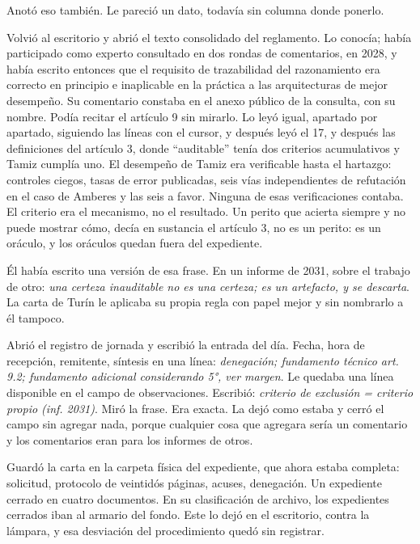 Anotó eso también. Le pareció un dato, todavía sin columna donde ponerlo.

Volvió al escritorio y abrió el texto consolidado del reglamento. Lo conocía; había participado como experto consultado en dos rondas de comentarios, en 2028, y había escrito entonces que el requisito de trazabilidad del razonamiento era correcto en principio e inaplicable en la práctica a las arquitecturas de mejor desempeño. Su comentario constaba en el anexo público de la consulta, con su nombre. Podía recitar el artículo 9 sin mirarlo. Lo leyó igual, apartado por apartado, siguiendo las líneas con el cursor, y después leyó el 17, y después las definiciones del artículo 3, donde ``auditable'' tenía dos criterios acumulativos y Tamiz cumplía uno. El desempeño de Tamiz era verificable hasta el hartazgo: controles ciegos, tasas de error publicadas, seis vías independientes de refutación en el caso de Amberes y las seis a favor. Ninguna de esas verificaciones contaba. El criterio era el mecanismo, no el resultado. Un perito que acierta siempre y no puede mostrar cómo, decía en sustancia el artículo 3, no es un perito: es un oráculo, y los oráculos quedan fuera del expediente.

Él había escrito una versión de esa frase. En un informe de 2031, sobre el trabajo de otro: \textit{una certeza inauditable no es una certeza; es un artefacto, y se descarta}. La carta de Turín le aplicaba su propia regla con papel mejor y sin nombrarlo a él tampoco.

Abrió el registro de jornada y escribió la entrada del día. Fecha, hora de recepción, remitente, síntesis en una línea: \textit{denegación; fundamento técnico art. 9.2; fundamento adicional considerando 5°, ver margen}. Le quedaba una línea disponible en el campo de observaciones. Escribió: \textit{criterio de exclusión = criterio propio (inf. 2031)}. Miró la frase. Era exacta. La dejó como estaba y cerró el campo sin agregar nada, porque cualquier cosa que agregara sería un comentario y los comentarios eran para los informes de otros.

Guardó la carta en la carpeta física del expediente, que ahora estaba completa: solicitud, protocolo de veintidós páginas, acuses, denegación. Un expediente cerrado en cuatro documentos. En su clasificación de archivo, los expedientes cerrados iban al armario del fondo. Este lo dejó en el escritorio, contra la lámpara, y esa desviación del procedimiento quedó sin registrar.


\scenebreak


